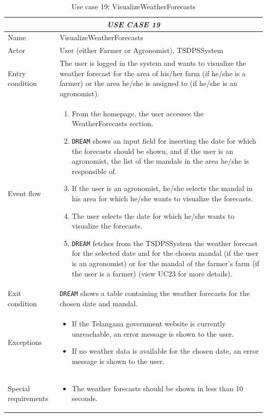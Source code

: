 \documentclass{article}
\begin{document}
\centering
\begin{longtable}{|p{3.5cm}|m{8cm}|}
\caption{Use case 19: VisualizeWeatherForecasts}
 \label{uc19}
 \hline
 \multicolumn{2}{|c|}{\cellcolor{white}\emph{USE CASE 19}} \\
 \endfirsthead
 \endhead
 \endfoot
 \endlastfoot
 \hline
 Name & VisualizeWeatherForecasts\\
 \hline
 Actor & User (either Farmer or Agronomist), TSDPSSystem \\
 \hline
 Entry condition & The user is logged in the system and wants to visualize the weather forecast for the area of his/her farm (if he/she is a farmer) or the area he/she is assigned to (if he/she is an agronomist).\\
 \hline
 Event flow & \begin{enumerate}
    \item From the homepage, the user accesses the WeatherForecasts section.
    \item \verb|DREAM| shows an input field for inserting the date for which the forecasts should be shown, and if the user is an agronomist, the list of the mandals in the area he/she is responsible of.
    \item If the user is an agronomist, he/she selects the mandal in his area for which he/she wants to visualize the forecasts. 
    \item The user selects the date for which he/she wants to visualize the forecasts.
    \item \verb|DREAM| fetches from the TSDPSSystem the weather forecast for the selected date and for the chosen mandal (if the user is an agronomist) or for the mandal of the farmer's farm (if the user is a farmer) (view UC23 for more details).
 \end{enumerate}\\
 \hline
 Exit condition & \verb|DREAM| shows a table containing the weather forecasts for the chosen date and mandal. \\
 \hline
 Exceptions & \begin{itemize}
     \item If the Telangana government website is currently unreachable, an error message is shown to the user.
     \item If no weather data is available for the chosen date, an error message is shown to the user.
 \end{itemize}\\
 \hline
 Special requirements &\begin{itemize}
     \item The weather forecasts should be shown in less than 10 seconds.
 \end{itemize}\\
 \hline
\end{longtable}
\end{document}
